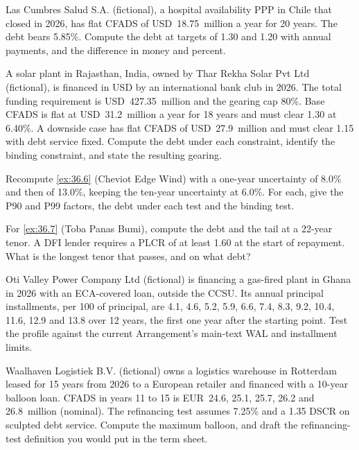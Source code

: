 \begin{exercise}\label{exr:36.7}
Las Cumbres Salud S.A. (fictional), a hospital availability PPP in Chile that closed in 2026, has flat CFADS of USD~18.75~million a year for 20 years. The debt bears 5.85\%. Compute the debt at targets of 1.30\x{} and 1.20\x{} with annual payments, and the difference in money and percent.
\end{exercise}

\begin{exercise}\label{exr:36.8}
A solar plant in Rajasthan, India, owned by Thar Rekha Solar Pvt Ltd (fictional), is financed in USD by an international bank club in 2026. The total funding requirement is USD~427.35~million and the gearing cap 80\%. Base CFADS is flat at USD~31.2~million a year for 18 years and must clear 1.30\x{} at 6.40\%. A downside case has flat CFADS of USD~27.9~million and must clear 1.15\x{} with debt service fixed. Compute the debt under each constraint, identify the binding constraint, and state the resulting gearing.
\end{exercise}

\begin{exercise}\label{exr:36.9}
Recompute \cref{ex:36.6} (Cheviot Edge Wind) with a one-year uncertainty of 8.0\% and then of 13.0\%, keeping the ten-year uncertainty at 6.0\%. For each, give the P90 and P99 factors, the debt under each test and the binding test.
\end{exercise}

\begin{exercise}\label{exr:36.10}
For \cref{ex:36.7} (Toba Panas Bumi), compute the debt and the tail at a 22-year tenor. A DFI lender requires a PLCR of at least 1.60\x{} at the start of repayment. What is the longest tenor that passes, and on what debt?
\end{exercise}

\begin{exercise}\label{exr:36.11}
Oti Valley Power Company Ltd (fictional) is financing a gas-fired plant in Ghana in 2026 with an ECA-covered loan, outside the CCSU. Its annual principal installments, per 100 of principal, are 4.1, 4.6, 5.2, 5.9, 6.6, 7.4, 8.3, 9.2, 10.4, 11.6, 12.9 and 13.8 over 12 years, the first one year after the starting point. Test the profile against the current Arrangement's main-text WAL and installment limits.
\end{exercise}

\begin{exercise}\label{exr:36.12}
Waalhaven Logistiek B.V. (fictional) owns a logistics warehouse in Rotterdam leased for 15 years from 2026 to a European retailer and financed with a 10-year balloon loan. CFADS in years 11 to 15 is EUR~24.6, 25.1, 25.7, 26.2 and 26.8~million (nominal). The refinancing test assumes 7.25\% and a 1.35\x{} DSCR on sculpted debt service. Compute the maximum balloon, and draft the refinancing-test definition you would put in the term sheet.
\end{exercise}

